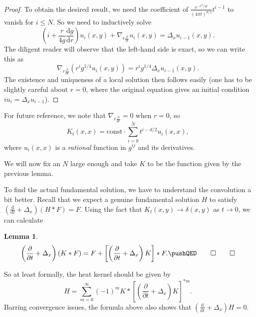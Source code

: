 \documentclass{shortart}
\newtheorem{lemma}[thm]{Lemma}
\theoremstyle{definition}
\renewcommand\d{\mathrm{d}}
\begin{document}
\begin{proof}
  To obtain the desired result, we need the coefficient of $\frac{e^{-r^2/4t}}{(4\pi t)^{d/2}} t^{i - 1}$ to vanish for $i \leq N$. So we need to inductively solve
  \[
    \left(i + \frac{r}{4g} \frac{\d g}{\d r}\right) u_i(x, y) + \nabla_{r \frac{\partial}{\partial r}} u_i(x, y) = \Delta_x u_{i - 1}(x, y).
  \]
  The diligent reader will observe that the left-hand side is exact, so we can write this as
  \[
    \nabla_{r\frac{\partial}{\partial r}} \left(r^i g^{1/4} u_i(x, y)\right) = r^i g^{1/4} \Delta_x u_{i - 1}(x, y).
  \]
  The existence and uniqueness of a local solution then follows easily (one has to be slightly careful about $r = 0$, where the original equation gives an initial condition $i u_i = \Delta_x u_{i - 1}$).
\end{proof}
For future reference, we note that $\nabla_{r \frac{\partial}{\partial r}} = 0$ when $r = 0$, so
\[
  K_t(x, x) = \text{const} \cdot \sum_{i = 0}^N  t^{i - d/2} u_i(x, x),
\]
where $u_i(x, x)$ is a \emph{rational} function in $g^{ij}$ and its derivatives.

We will now fix an $N$ large enough and take $K$ to be the function given by the previous lemma.

To find the actual fundamental solution, we have to understand the convolution a bit better. Recall that we expect a genuine fundamental solution $H$ to satisfy $\left(\frac{\d}{\d t} + \Delta_x\right) (H * F) = F$. Using the fact that $K_t(x, y) \to \delta(x, y)$ as $t \to 0$, we can calculate
\begin{lemma}
  \[
    \left(\frac{\partial}{\partial t} + \Delta_x\right) (K * F) = F + \left[\left(\frac{\partial}{\partial t} + \Delta_x\right)K\right] * F.\fakeqed
  \]\ifplastex\fakeqed\fi
\end{lemma}
So at least formally, the heat kernel should be given by
\[
  H = \sum_{m = 0}^\infty (-1)^m K * \left[\left(\frac{\partial}{\partial t} + \Delta_x\right)K\right]^{*m}.
\]
Barring convergence issues, the formula above also shows that $\left(\frac{\d}{\d t} + \Delta_x\right) H = 0$.
\end{document}
